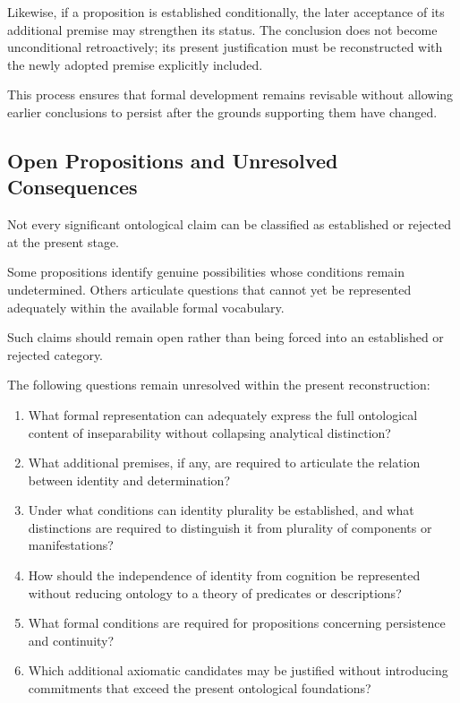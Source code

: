 Likewise, if a proposition is established conditionally,
the later acceptance of its additional premise may strengthen
its status. The conclusion does not become unconditional
retroactively; its present justification must be reconstructed
with the newly adopted premise explicitly included.

This process ensures that formal development remains
revisable without allowing earlier conclusions to persist
after the grounds supporting them have changed.

\subsection{Open Propositions and Unresolved Consequences}

Not every significant ontological claim can be classified
as established or rejected at the present stage.

Some propositions identify genuine possibilities whose
conditions remain undetermined. Others articulate questions
that cannot yet be represented adequately within the available
formal vocabulary.

Such claims should remain open rather than being forced
into an established or rejected category.

The following questions remain unresolved within the
present reconstruction:

\begin{enumerate}
    \item What formal representation can adequately express
    the full ontological content of inseparability without
    collapsing analytical distinction?

    \item What additional premises, if any, are required to
    articulate the relation between identity and determination?

    \item Under what conditions can identity plurality be
    established, and what distinctions are required to
    distinguish it from plurality of components or manifestations?

    \item How should the independence of identity from
    cognition be represented without reducing ontology to
    a theory of predicates or descriptions?

    \item What formal conditions are required for propositions
    concerning persistence and continuity?

    \item Which additional axiomatic candidates may be
    justified without introducing commitments that exceed
    the present ontological foundations?
\end{enumerate}

